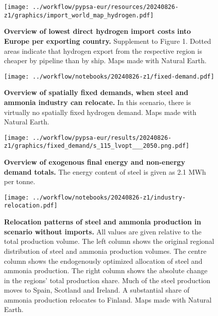 \begin{figure}[!htb]
    \texttt{[image: ../workflow/pypsa-eur/resources/20240826-z1/graphics/import\_world\_map\_hydrogen.pdf]} \\
    \caption{\textbf{Overview of lowest direct hydrogen import costs into Europe
    per exporting country.} Supplement to Figure 1. Dotted areas indicate that
    hydrogen export from the respective region is cheaper by pipeline than by
    ship. Maps made with Natural Earth.}
    \label{fig:si:worlmap-h2}
\end{figure}


\begin{figure}[!htb]
    \texttt{[image: ../workflow/notebooks/20240826-z1/fixed-demand.pdf]} \\
    \caption{\textbf{Overview of spatially fixed demands, when steel and ammonia
    industry can relocate.} In this scenario, there is virtually no spatially
    fixed hydrogen demand. Maps made with Natural Earth.}
    \label{fig:si:demands}
\end{figure}

\begin{figure}[!htb]
    \texttt{[image: ../workflow/pypsa-eur/results/20240826-z1/graphics/fixed\_demand/s\_115\_lvopt\_\_\_2050.png.pdf]} \\
    \caption{\textbf{Overview of exogenous final energy and non-energy demand totals.}
    The energy content of steel is given as 2.1 MWh per tonne.
    }
    \label{fig:si:demand_totals}
\end{figure}


\begin{figure}[!htb]
    \texttt{[image: ../workflow/notebooks/20240826-z1/industry-relocation.pdf]} \\
    \caption{\textbf{Relocation patterns of steel and ammonia production in
    scenario without imports.} All values are given relative to the total
    production volume. The left column shows the original regional distribution
    of steel and ammonia production volumes. The centre column shows the
    endogenously optimized allocation of steel and ammonia production. The right
    column shows the absolute change in the regions' total production share.
    Much of the steel production moves to Spain, Scotland and Ireland. A
    substantial share of ammonia production relocates to Finland. Maps made with Natural Earth.}
    \label{fig:si:relocation}
\end{figure}

